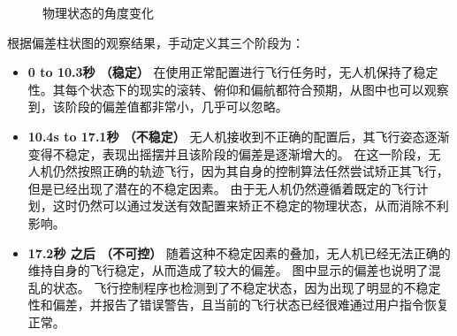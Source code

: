 \begin{figure}[htb]
\caption{物理状态的角度变化}
\label{fig:frozen_state}
\end{figure}
根据偏差柱状图的观察结果，手动定义其三个阶段为：
\begin{itemize}
\item \textbf{0 to 10.3秒 （稳定）} 
在使用正常配置进行飞行任务时，无人机保持了稳定性。其每个状态下的现实的滚转、俯仰和偏航都符合预期，从图中也可以观察到，该阶段的偏差值都非常小，几乎可以忽略。


\item \textbf{10.4s to 17.1秒 （不稳定）}
无人机接收到不正确的配置后，其飞行姿态逐渐变得不稳定，表现出摇摆并且该阶段的偏差是逐渐增大的。
在这一阶段，无人机仍然按照正确的轨迹飞行，因为其自身的控制算法任然尝试矫正其飞行，但是已经出现了潜在的不稳定因素。
由于无人机仍然遵循着既定的飞行计划，这时仍然可以通过发送有效配置来矫正不稳定的物理状态，从而消除不利影响。


\item \textbf{17.2秒 之后 （不可控）}
随着这种不稳定因素的叠加，无人机已经无法正确的维持自身的飞行稳定，从而造成了较大的偏差。
图中显示的偏差也说明了混乱的状态。
飞行控制程序也检测到了不稳定状态，因为出现了明显的不稳定性和偏差，并报告了错误警告，且当前的飞行状态已经很难通过用户指令恢复正常。

\end{itemize}

